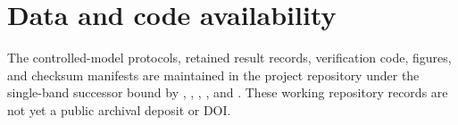 \documentclass[preprint,12pt]{elsarticle}
\begin{document}
\section*{Data and code availability}
The controlled-model protocols, retained result records, verification code,
figures, and checksum manifests are maintained in the project repository under
the single-band successor bound by ,
,
,
, and
. These working repository
records are not yet a public archival deposit or DOI.



\end{document}
